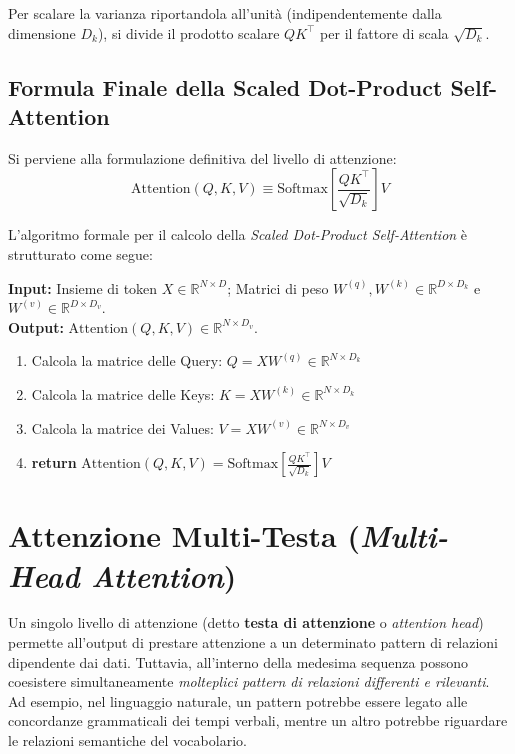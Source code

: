 Per scalare la varianza riportandola all'unità (indipendentemente dalla dimensione $D_k$), si divide il prodotto scalare $Q K^\top$ per il fattore di scala $\sqrt{D_k}$.

\subsection{Formula Finale della Scaled Dot-Product Self-Attention}
Si perviene alla formulazione definitiva del livello di attenzione:
\begin{equation}
\text{Attention}(Q, K, V) \equiv \text{Softmax}\left[ \frac{Q K^\top}{\sqrt{D_k}} \right] V \label{eq:scaled_dot_product_attention}
\end{equation}

L'algoritmo formale per il calcolo della \textit{Scaled Dot-Product Self-Attention} è strutturato come segue:

\begin{tcolorbox}[colback=gray!5!white,colframe=gray!75!black,title=Algoritmo 12.1: Scaled Dot-Product Self-Attention]
\textbf{Input:} Insieme di token $X \in \mathbb{R}^{N \times D}$; Matrici di peso $W^{(q)}, W^{(k)} \in \mathbb{R}^{D \times D_k}$ e $W^{(v)} \in \mathbb{R}^{D \times D_v}$.\\
\textbf{Output:} $\text{Attention}(Q, K, V) \in \mathbb{R}^{N \times D_v}$.
\begin{enumerate}
    \item Calcola la matrice delle Query: $Q = X W^{(q)} \in \mathbb{R}^{N \times D_k}$
    \item Calcola la matrice delle Keys: $K = X W^{(k)} \in \mathbb{R}^{N \times D_k}$
    \item Calcola la matrice dei Values: $V = X W^{(v)} \in \mathbb{R}^{N \times D_v}$
    \item \textbf{return} $\text{Attention}(Q, K, V) = \text{Softmax}\left[ \frac{Q K^\top}{\sqrt{D_k}} \right] V$
\end{enumerate}
\end{tcolorbox}

\section{Attenzione Multi-Testa (\textit{Multi-Head Attention})}
Un singolo livello di attenzione (detto \textbf{testa di attenzione} o \textit{attention head}) permette all'output di prestare attenzione a un determinato pattern di relazioni dipendente dai dati. Tuttavia, all'interno della medesima sequenza possono coesistere simultaneamente \emph{molteplici pattern di relazioni differenti e rilevanti}. Ad esempio, nel linguaggio naturale, un pattern potrebbe essere legato alle concordanze grammaticali dei tempi verbali, mentre un altro potrebbe riguardare le relazioni semantiche del vocabolario.

